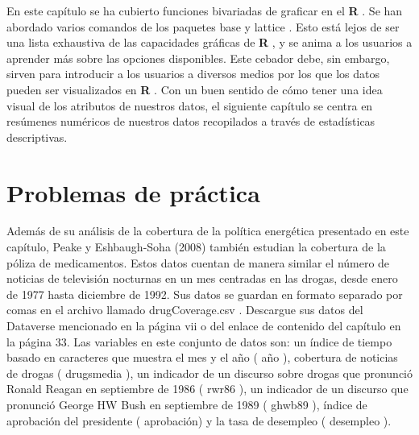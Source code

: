 \documentclass[
]{book}
\begin{document}
En este capítulo se ha cubierto funciones bivariadas de graficar en el \textbf{R} . Se han abordado varios comandos de los paquetes base y lattice . Esto está lejos de ser una lista exhaustiva de las capacidades gráficas de \textbf{R} , y se anima a los usuarios a aprender más sobre las opciones disponibles. Este cebador debe, sin embargo, sirven para introducir a los usuarios a diversos medios por los que los datos pueden ser visualizados en \textbf{R} . Con un buen sentido de cómo tener una idea visual de los atributos de nuestros datos, el siguiente capítulo se centra en resúmenes numéricos de nuestros datos recopilados a través de estadísticas descriptivas.

\hypertarget{problemas-de-pruxe1ctica}{%
\section*{Problemas de práctica}\label{problemas-de-pruxe1ctica}}

Además de su análisis de la cobertura de la política energética presentado en este capítulo, Peake y Eshbaugh-Soha (2008) también estudian la cobertura de la póliza de medicamentos. Estos datos cuentan de manera similar el número de noticias de televisión nocturnas en un mes centradas en las drogas, desde enero de 1977 hasta diciembre de 1992. Sus datos se guardan en formato separado por comas en el archivo llamado drugCoverage.csv . Descargue sus datos del Dataverse mencionado en la página vii o del enlace de contenido del capítulo en la página 33. Las variables en este conjunto de datos son: un índice de tiempo basado en caracteres que muestra el mes y el año ( año ), cobertura de noticias de drogas ( drugsmedia ), un indicador de un discurso sobre drogas que pronunció Ronald Reagan en septiembre de 1986 ( rwr86 ), un indicador de un discurso que pronunció George HW Bush en septiembre de 1989 ( ghwb89 ), índice de aprobación del presidente ( aprobación) y la tasa de desempleo ( desempleo ).
\end{document}
